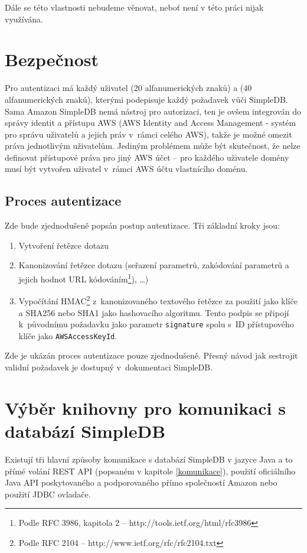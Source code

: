 \documentclass[oneside,12pt]{fithesis2}
\begin{document}
Dále se této vlastnosti nebudeme věnovat, neboť není v této práci nijak využívána.

\section{Bezpečnost}
Pro autentizaci má každý uživatel  (20 alfanumerických znaků) a  (40 alfanumerických znaků), kterými podepisuje každý požadavek vůči SimpleDB. Sama Amazon SimpleDB nemá nástroj pro autorizaci, ten je ovšem integrován do správy identit a přístupu AWS (AWS Identity and Access Management - systém pro správu uživatelů a jejich práv v~rámci celého AWS), takže je možné omezit práva jednotlivým uživatelům. Jediným problémem může být skutečnost, že nelze definovat přístupové práva pro jiný AWS účet -- pro každého uživatele domény musí být vytvořen uživatel v~rámci AWS účtu vlastnícího doménu\cite{simpledb}.

\subsection{Proces autentizace}
Zde bude zjednodušeně popsán postup autentizace. Tři základní kroky jsou:
\begin{enumerate}
 \item Vytvoření řetězce dotazu
 \item Kanonizování řetězce dotazu (seřazení parametrů, zakódování parametrů a jejich hodnot URL kódováním\footnote{Podle RFC 3986, kapitola 2 -- http://tools.ietf.org/html/rfc3986}), \dots)
 \item Vypočítání HMAC\footnote{Podle RFC 2104 -- http://www.ietf.org/rfc/rfc2104.txt} z~kanonizovaného textového řetězce za použití  jako klíče a SHA256 nebo SHA1 jako hashovacího algoritmu. Tento podpis se připojí k~původnímu požadavku jako parametr \verb<signature< spolu s~ID přístupového klíče jako \verb<AWSAccessKeyId<.
\end{enumerate}
Zde je ukázán proces autentizace pouze zjednodušeně. Přesný návod jak sestrojit validní požadavek je dostupný v~dokumentaci SimpleDB\cite[strana 24, Authentication Process]{simpledbDeveloper}.

\section{Výběr knihovny pro komunikaci s databází SimpleDB}
Existují tři hlavní způsoby komunikace s databází SimpleDB v jazyce Java a to přímé volání REST API (popsaném v kapitole \ref{komunikace}), použití oficiálního Java API poskytovaného a podporovaného přímo společností Amazon nebo použití JDBC ovladače.
\end{document}
